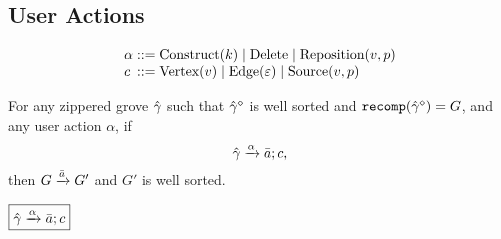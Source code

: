 \subsection{User Actions}

\[
  \arraycolsep=0pt
  \begin{array}{llll}
    \alpha & {}::={} &
      \Construct{k}
      \mid \Delete
      \mid \Reposition{v}{p}
    \\
    c & {}::={} &
      \CVertex{v}
      \mid \CEdge{\e}
      \mid \CSource{v}{p}
    \\
  \end{array}
\]

\begin{theorem}[Sensibility]
  For any zippered grove $\Z{\Grove}$
  such that $\erase{\Z{\Grove}}$ is well sorted
    and $\recomp{\erase{\Z{\Grove}}} = G$,
  and any user action $\alpha$,
  if
  \[
    \applyAction{\Z{\Grove}}{\alpha}{\Q{a}}{c},
  \]
  then $G \action{\Q{a}} G'$ and $G'$ is well sorted.
\end{theorem}

\noindent $\boxed{\applyAction{ \Z{\Grove} }{ \alpha }{ \Q{a} }{ c }}$
%
\begin{mathpar}


\end{mathpar}

